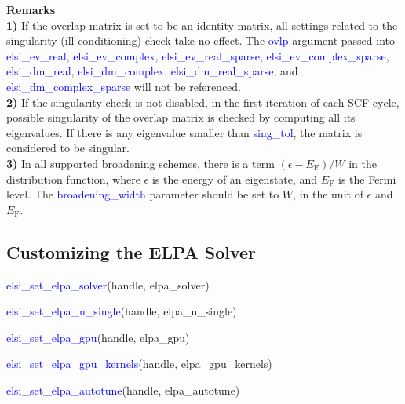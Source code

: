 \documentclass{report}
\begin{document}
\bigskip
\textbf{Remarks}\\

\textbf{1)} If the overlap matrix is set to be an identity matrix, all settings related to the singularity (ill-conditioning) check take no effect.  The \textcolor{blue}{ovlp} argument passed into \textcolor{blue}{elsi\_ev\_real}, \textcolor{blue}{elsi\_ev\_complex}, \textcolor{blue}{elsi\_ev\_real\_sparse}, \textcolor{blue}{elsi\_ev\_complex\_sparse}, \textcolor{blue}{elsi\_dm\_real}, \textcolor{blue}{elsi\_dm\_complex}, \textcolor{blue}{elsi\_dm\_real\_sparse}, and \textcolor{blue}{elsi\_dm\_complex\_sparse} will not be referenced.\\

\textbf{2)} If the singularity check is not disabled, in the first iteration of each SCF cycle, possible singularity of the overlap matrix is checked by computing all its eigenvalues.  If there is any eigenvalue smaller than \textcolor{blue}{sing\_tol}, the matrix is considered to be singular.\\

\textbf{3)} In all supported broadening schemes, there is a term $(\epsilon - E_\text{F})/W$ in the distribution function, where $\epsilon$ is the energy of an eigenstate, and $E_\text{F}$ is the Fermi level.  The \textcolor{blue}{broadening\_width} parameter should be set to $W$, in the unit of $\epsilon$ and $E_\text{F}$.\\

\subsection{Customizing the ELPA Solver}
\label{subsec:setter_elpa}
\begin{labeling}{\hspace{6cm}}
\item [\hspace{0.3cm} \textcolor{blue}{elsi\_set\_elpa\_solver}(handle, elpa\_solver)]
\item [\hspace{0.3cm} \textcolor{blue}{elsi\_set\_elpa\_n\_single}(handle, elpa\_n\_single)]
\item [\hspace{0.3cm} \textcolor{blue}{elsi\_set\_elpa\_gpu}(handle, elpa\_gpu)]
\item [\hspace{0.3cm} \textcolor{blue}{elsi\_set\_elpa\_gpu\_kernels}(handle, elpa\_gpu\_kernels)]
\item [\hspace{0.3cm} \textcolor{blue}{elsi\_set\_elpa\_autotune}(handle, elpa\_autotune)]
\end{labeling}
\end{document}

